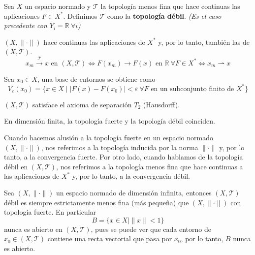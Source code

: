 \documentclass[12pt]{book}
\begin{document}
\begin{definicion}
    Sea $X$ un espacio normado y $\mathcal{T}$ la topología menos fina que hace continuas las aplicaciones $F \in X^*$. Definimos $\mathcal{T}$ como la \textbf{topología débil}. \textit{\small (Es el caso precedente con $Y_i = \mathbb{R} \ \forall i$)} \\
\end{definicion}

\begin{observacion}
    $(X, \|\cdot\|)$ hace continuas las aplicaciones de $X^*$ y, por lo tanto, también las de $(X, \mathcal{T})$.
    \[ x_m \xrightarrow{\mathcal{T}} x \text{ en } (X, \mathcal{T}) \iff F(x_m) \longrightarrow F(x) \text{ en } \mathbb{R} \ \forall F \in X^* \iff x_m \rightharpoonup x \]

\end{observacion}


\begin{observacion}
    Sea $x_0 \in X$, una base de entornos se obtiene como
    \[ V_\varepsilon(x_0) = \{ x \in X \mid |F(x) - F(x_0)| < \varepsilon \ \forall F \text{ en un subconjunto finito de } X^* \} \]
\end{observacion}


\begin{prop}
    $(X, \mathcal{T})$ satisface el axioma de separación $T_2$ (Hausdorff). \\
\end{prop}

\begin{observacion}
    En dimensión finita, la topología fuerte y la topología débil coinciden.
\end{observacion}


\begin{observacion}
    Cuando hacemos alusión a la topología fuerte en un espacio normado $(X,\|\cdot\|)$, nos referimos a la topología inducida por la norma $\|\cdot\|$ y, por lo tanto, a la convergencia fuerte. Por otro lado, cuando hablamos de la topología débil en $(X, \mathcal{T})$, nos referimos a la topología menos fina que hace continuas a las aplicaciones de $X^*$ y, por lo tanto, a la convergencia débil.
\end{observacion}

\begin{observacion}
    Sea $(X, \|\cdot\|)$ un espacio normado de dimensión infinita, entonces $(X, \mathcal{T})$ débil es siempre estrictamente menos fina (más pequeña) que $(X, \|\cdot\|)$ con topología fuerte. En particular
    \begin{equation*}
        B = \{ x \in X \mid \|x\| < 1 \}
    \end{equation*}
    nunca es abierto en $(X, \mathcal{T})$, pues se puede ver que cada entorno de $x_0 \in (X, \mathcal{T})$ contiene una recta vectorial que pasa por $x_0$, por lo tanto, $B$ nunca es abierto. 
\end{observacion}
\end{document}
